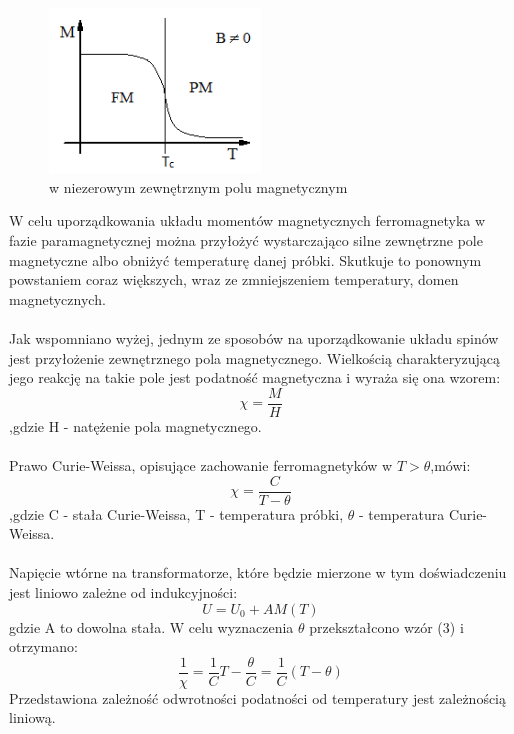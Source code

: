 \documentclass[a4paper,10pt]{article}
\begin{document}
\begin{figure}[H]
		\includegraphics[width=0.5\textwidth]{wykres2.png}
		\caption{w niezerowym zewnętrznym polu magnetycznym}
\end{figure}
W celu uporządkowania układu momentów magnetycznych ferromagnetyka w fazie paramagnetycznej można przyłożyć wystarczająco silne zewnętrzne pole magnetyczne albo obniżyć temperaturę danej próbki. Skutkuje to ponownym powstaniem coraz większych, wraz ze zmniejszeniem temperatury, domen magnetycznych.
\\
\\Jak wspomniano wyżej, jednym ze sposobów na uporządkowanie układu spinów jest przyłożenie zewnętrznego pola magnetycznego. Wielkością charakteryzującą jego reakcję na takie pole jest podatność magnetyczna i wyraża się ona wzorem:
\begin{equation}
\chi = \frac{M}{H}
\end{equation}
,gdzie H - natężenie pola magnetycznego.
\\
\\Prawo Curie-Weissa, opisujące zachowanie ferromagnetyków w $T > \theta$,mówi:
\begin{equation}
\chi = \frac{C}{T - \theta}
\end{equation}
,gdzie C - stała Curie-Weissa, T - temperatura próbki, $\theta$ - temperatura Curie-Weissa.
\\
\\Napięcie wtórne na transformatorze, które będzie mierzone w tym doświadczeniu jest liniowo zależne od indukcyjności:
\begin{equation}
U = U_0 + AM(T)
\end{equation}
gdzie A to dowolna stała. W celu wyznaczenia $\theta$ przekształcono wzór (3) i otrzymano:
\begin{equation}
\frac{1}{\chi} = \frac{1}{C} T - \frac{\theta}{C} = \frac{1}{C} (T-\theta)
\end{equation}
Przedstawiona zależność odwrotności podatności od temperatury jest zależnością liniową.
\end{document}
